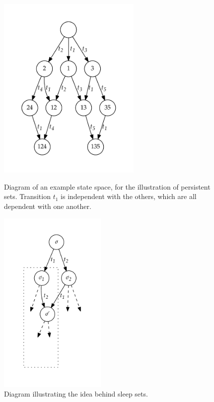 \documentclass[12pt,a4paper,twoside,openany]{report}
\begin{document}
\begin{figure}
	\centering
	\begin{minipage}{.45\textwidth}
		\centering
		\includegraphics[height=9cm]{persistent1}
		\caption[Diagram of an example state space, for
		the illustration of persistent sets.]
		{Diagram of an example state space, for
			the illustration of persistent sets. Transition
			$t_1$ is independent with the others, which are
			all dependent with one another.}
		\label{fig:persistent}
	\end{minipage}%
	\qquad
	\begin{minipage}{.45\textwidth}
		\centering
		\includegraphics[height=9cm]{sleep}
		\caption{Diagram illustrating the
			idea behind sleep sets.}
		\label{fig:sleep}
	\end{minipage}
	
\end{figure}
\end{document}
